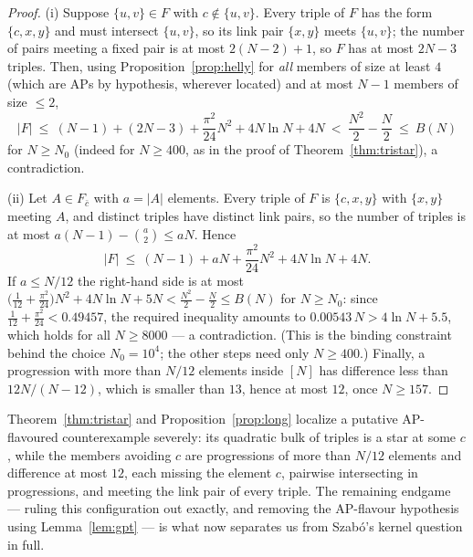 \documentclass[11pt]{article}
\theoremstyle{definition}
\begin{document}
\begin{proof}
(i) Suppose $\{u,v\}\in F$ with $c\notin\{u,v\}$. Every triple of $F$ has the form $\{c,x,y\}$ and must intersect $\{u,v\}$, so its link pair $\{x,y\}$ meets $\{u,v\}$; the number of pairs meeting a fixed pair is at most $2(N-2)+1$, so $F$ has at most $2N-3$ triples. Then, using Proposition~\ref{prop:helly} for \emph{all} members of size at least $4$ (which are APs by hypothesis, wherever located) and at most $N-1$ members of size $\le 2$,
\[ |F|\ \le\ (N-1)+(2N-3)+\frac{\pi^2}{24}N^2+4N\ln N+4N\ <\ \frac{N^2}{2}-\frac{N}{2}\ \le\ B(N) \]
for $N\ge N_0$ (indeed for $N\ge400$, as in the proof of Theorem~\ref{thm:tristar}), a contradiction.

(ii) Let $A\in F_{\bar c}$ with $a=|A|$ elements. Every triple of $F$ is $\{c,x,y\}$ with $\{x,y\}$ meeting $A$, and distinct triples have distinct link pairs, so the number of triples is at most $a(N-1)-\binom a2\le aN$. Hence
\[ |F|\ \le\ (N-1)+aN+\frac{\pi^2}{24}N^2+4N\ln N+4N. \]
If $a\le N/12$ the right-hand side is at most $\bigl(\tfrac1{12}+\tfrac{\pi^2}{24}\bigr)N^2+4N\ln N+5N<\tfrac{N^2}2-\tfrac N2\le B(N)$ for $N\ge N_0$: since $\tfrac1{12}+\tfrac{\pi^2}{24}<0.49457$, the required inequality amounts to $0.00543\,N>4\ln N+5.5$, which holds for all $N\ge 8000$ --- a contradiction. (This is the binding constraint behind the choice $N_0=10^4$; the other steps need only $N\ge400$.) Finally, a progression with more than $N/12$ elements inside $[N]$ has difference less than $12N/(N-12)$, which is smaller than $13$, hence at most $12$, once $N\ge157$.
\end{proof}

Theorem~\ref{thm:tristar} and Proposition~\ref{prop:long} localize a putative AP-flavoured counterexample severely: its quadratic bulk of triples is a star at some $c$, while the members avoiding $c$ are progressions of more than $N/12$ elements and difference at most $12$, each missing the element $c$, pairwise intersecting in progressions, and meeting the link pair of every triple. The remaining endgame --- ruling this configuration out exactly, and removing the AP-flavour hypothesis using Lemma~\ref{lem:gpt} --- is what now separates us from Szab\'o's kernel question in full.
\end{document}
